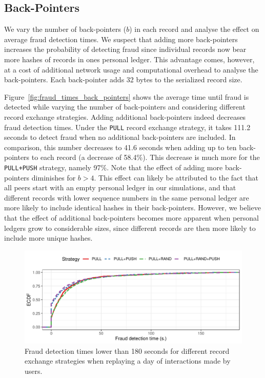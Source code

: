\subsection{Back-Pointers}
We vary the number of back-pointers ($ b $) in each record and analyse the effect on average fraud detection times.
We suspect that adding more back-pointers increases the probability of detecting fraud since individual records now bear more hashes of records in ones personal ledger.
This advantage comes, however, at a cost of additional network usage and computational overhead to analyse the back-pointers.
Each back-pointer adds 32 bytes to the serialized record size.

Figure~\ref{fig:fraud_times_back_pointers} shows the average time until fraud is detected while varying the number of back-pointers and considering different record exchange strategies.
Adding additional back-pointers indeed decreases fraud detection times.
Under the \texttt{PULL} record exchange strategy, it takes 111.2 seconds to detect fraud when no additional back-pointers are included. In comparison, this number decreases to 41.6 seconds when adding up to ten back-pointers to each record (a decrease of 58.4\%).
This decrease is much more for the \texttt{PULL+PUSH} strategy, namely 97\%.
Note that the effect of adding more back-pointers diminishes for $ b > 4 $.
This effect can likely be attributed to the fact that all peers start with an empty personal ledger in our simulations, and that different records with lower sequence numbers in the same personal ledger are more likely to include identical hashes in their back-pointers.
However, we believe that the effect of additional back-pointers becomes more apparent when personal ledgers grow to considerable sizes, since different records are then more likely to include more unique hashes.

\begin{figure}[t]
	\centering
	\includegraphics[width=\linewidth]{trustchain/assets/fraud_experiment_realistic_ecdf}
	\caption{Fraud detection times lower than 180 seconds for different record exchange strategies when replaying a day of interactions made by \Tribler{} users.}
	\label{fig:fraud_times_realistic_dataset}
\end{figure}

